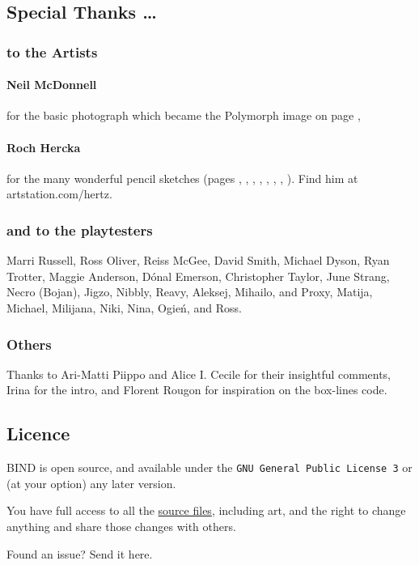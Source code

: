 \begin{multicols}{2}
\subsection*{Special Thanks \ldots}

\subsubsection*{to the Artists}

\paragraph{Neil McDonnell} for the basic photograph which became the Polymorph image on page \pageref{Roch_Hercka/polymorph},

\paragraph{Roch Hercka} for the many wonderful pencil sketches (pages 
\pageref{Roch_Hercka/cave_fight}, 
\pageref{Roch_Hercka/dwarf_encumbrance}, 
\pageref{Roch_Hercka/vitals_shot}, 
\pageref{Roch_Hercka/stances}, 
\pageref{Roch_Hercka/conjuration_right}, 
\pageref{Roch_Hercka/dwarvish_runes}, 
\pageref{Roch_Hercka/polymorph}, 
\pageref{Roch_Hercka/flashing_light}).
Find him at artstation.com/hertz.

\subsubsection*{and to the playtesters} Marri Russell, Ross Oliver, Reiss McGee, David Smith, Michael Dyson, Ryan Trotter, Maggie Anderson, 
D\'{o}nal Emerson, Christopher Taylor, June Strang, 
Necro (Bojan), Jigzo, Nibbly, Reavy, 
Aleksej, Mihailo, and Proxy,
Matija, Michael, Milijana, Niki, Nina, Ogie\'n,
and Ross.

\subsubsection*{Others}
Thanks to Ari-Matti Piippo and Alice I. Cecile for their insightful comments,
Irina for the intro,
and Florent Rougon for inspiration on the box-lines code.

\subsection*{Licence}

BIND is open source, and available under the {\tt GNU General Public License 3} or (at your option) any later version.

You have full access to all the \href{https://gitlab.com/bindrpg/core}{source files}, including art, and the right to change anything and share those changes with others.

\begin{center}
  
  Found an issue?
  Send it here.
\end{center}

\end{multicols}
